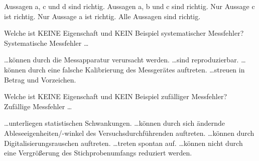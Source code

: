\documentclass[11pt]{exam}
\begin{document}
\begin{questions}
\begin{choices}
	\choice Aussagen a, c und d sind richtig.
	\choice Aussagen a, b und c sind richtig.
	\choice Nur Aussage c ist richtig.
	\choice Nur Aussage a ist richtig.
	\choice Alle Aussagen sind richtig.
\end{choices}



\newpage

\vspace{12mm}\question Welche ist KEINE Eigenschaft und KEIN Beispiel systematischer Messfehler? \\
Systematische Messfehler \dots \\

\begin{choices}
	\choice \dots können durch die Messapparatur verursacht werden.
	\choice \dots sind reproduzierbar.
	\choice \dots können durch eine falsche Kalibrierung des Messgerätes auftreten.
	\choice \dots streuen in Betrag und Vorzeichen.
\end{choices}


\vspace{12mm}\question Welche ist KEINE Eigenschaft und KEIN Beispiel zufälliger Messfehler? \\
Zufällige Messfehler \dots \\

\begin{choices}
	\choice \dots unterliegen statistischen Schwankungen.
	\choice \dots können durch sich ändernde Ableseeigenheiten/-winkel des Versuchsdurchführenden auftreten.
	\choice \dots können durch Digitalisierungsrauschen auftreten.
	\choice \dots treten spontan auf.
	\choice \dots können nicht durch eine Vergrößerung des Stichprobenumfangs reduziert werden.
\end{choices}

\vspace{3mm}\end{questions}
\end{document}
